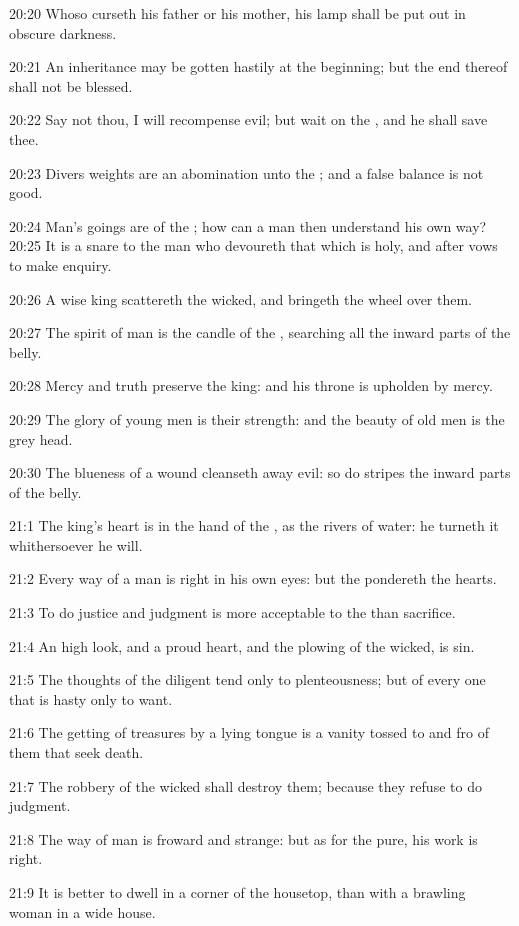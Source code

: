 20:20 Whoso curseth his father or his mother, his lamp shall be put out in obscure darkness.

20:21 An inheritance may be gotten hastily at the beginning; but the end thereof shall not be blessed.

20:22 Say not thou, I will recompense evil; but wait on the \LORD, and he shall save thee.

20:23 Divers weights are an abomination unto the \LORD; and a false balance is not good.

20:24 Man's goings are of the \LORD; how can a man then understand his own way?  20:25 It is a snare to the man who devoureth that which is holy, and after vows to make enquiry.

20:26 A wise king scattereth the wicked, and bringeth the wheel over them.

20:27 The spirit of man is the candle of the \LORD, searching all the inward parts of the belly.

20:28 Mercy and truth preserve the king: and his throne is upholden by mercy.

20:29 The glory of young men is their strength: and the beauty of old men is the grey head.

20:30 The blueness of a wound cleanseth away evil: so do stripes the inward parts of the belly.

21:1 The king's heart is in the hand of the \LORD, as the rivers of water: he turneth it whithersoever he will.

21:2 Every way of a man is right in his own eyes: but the \LORD pondereth the hearts.

21:3 To do justice and judgment is more acceptable to the \LORD than sacrifice.

21:4 An high look, and a proud heart, and the plowing of the wicked, is sin.

21:5 The thoughts of the diligent tend only to plenteousness; but of every one that is hasty only to want.

21:6 The getting of treasures by a lying tongue is a vanity tossed to and fro of them that seek death.

21:7 The robbery of the wicked shall destroy them; because they refuse to do judgment.

21:8 The way of man is froward and strange: but as for the pure, his work is right.

21:9 It is better to dwell in a corner of the housetop, than with a brawling woman in a wide house.

